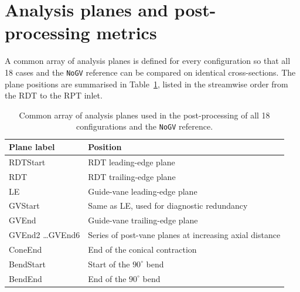 \section{Analysis planes and post-processing metrics}
\label{sec:methods_planes_metrics}
 
A common array of analysis planes is defined for every configuration so that all 18 cases and the \texttt{NoGV} reference can be compared on identical cross-sections. The plane positions are summarised in Table~\ref{tab:planes}, listed in the streamwise order from the RDT to the RPT inlet.
 
\begin{table}[h!]
  \centering
  \caption[Analysis planes]{Common array of analysis planes used in the post-processing of all 18 configurations and the \texttt{NoGV} reference.}
  \label{tab:planes}
  \small
  \begin{tabular}{l|l}
    \toprule
    \textbf{Plane label} & \textbf{Position} \\
    \midrule
    RDTStart   & RDT leading-edge plane \\
    RDT        & RDT trailing-edge plane \\
    LE         & Guide-vane leading-edge plane \\
    GVStart    & Same as LE, used for diagnostic redundancy \\
    GVEnd      & Guide-vane trailing-edge plane \\
    GVEnd2 \dots GVEnd6 & Series of post-vane planes at increasing axial distance \\
    ConeEnd    & End of the conical contraction \\
    BendStart  & Start of the $90^\circ$ bend \\
    BendEnd    & End of the $90^\circ$ bend \\
    \bottomrule
  \end{tabular}
\end{table}
 
